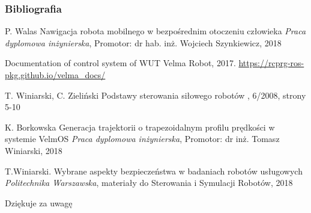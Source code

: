 
\begin{frame}[plain]
\addtocounter{framenumber}{-1}
\frametitle{Bibliografia}
\footnotesize{
\begin{thebibliography}{99} %
 P. Walas
\newblock Nawigacja robota mobilnego w bezpośrednim otoczeniu człowieka
\newblock \emph{Praca dyplomowa inżynierska}, Promotor: dr hab. inż. Wojciech Szynkiewicz, 2018

 Documentation of control system of WUT Velma Robot, 2017.
\newblock \url{https://rcprg-ros-pkg.github.io/velma\_docs/}

 T. Winiarski, C. Zieliński
\newblock Podstawy sterowania siłowego robotów
, 6/2008, strony 5-10

 K. Borkowska
\newblock Generacja trajektorii o trapezoidalnym profilu prędkości w systemie VelmOS
\newblock \emph{Praca dyplomowa inżynierska}, Promotor: dr inż. Tomasz Winiarski, 2018

 T.Winiarski.
\newblock Wybrane aspekty bezpieczeństwa w badaniach robotów usługowych
\newblock \emph{Politechnika Warszawska}, materiały do Sterowania i Symulacji Robotów, 2018 
\end{thebibliography}
}
\end{frame}


\begin{frame}[plain]
\addtocounter{framenumber}{-1}
\Huge{\centerline{Dziękuje za uwagę}}
\end{frame}